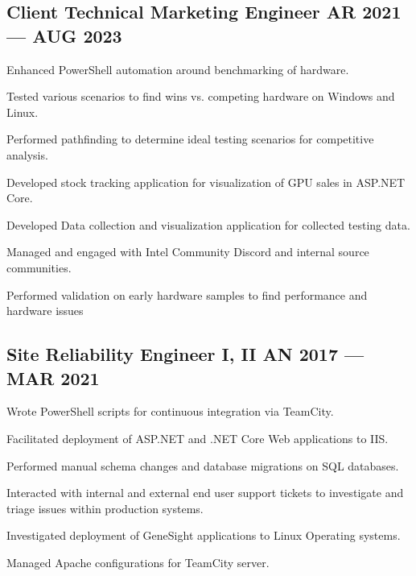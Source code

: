 \subsection{{Client Technical Marketing Engineer \texorpdfstring{\hfill} \texorpdfstring{\null} MAR 2021 --- AUG 2023}}
\begin{zitemize}
\item Enhanced PowerShell automation around benchmarking of hardware.
\item Tested various scenarios to find wins vs. competing hardware on Windows and Linux.
\item Performed pathfinding to determine ideal testing scenarios for competitive analysis.
\item Developed stock tracking application for visualization of GPU sales in ASP.NET Core.
\item Developed Data collection and visualization application for collected testing data.
\item Managed and engaged with Intel Community Discord and internal source communities.
\item Performed validation on early hardware samples to find performance and hardware issues
\end{zitemize}

\subsection{{Site Reliability Engineer I, II \texorpdfstring{\hfill} \texorpdfstring{\null} JAN 2017 --- MAR 2021}}
\begin{zitemize}
\item Wrote PowerShell scripts for continuous integration via TeamCity.
\item Facilitated deployment of ASP.NET and .NET Core Web applications to IIS.
\item Performed manual schema changes and database migrations on SQL databases.
\item Interacted with internal and external end user support tickets to investigate and triage issues within production systems.
\item Investigated deployment of GeneSight applications to Linux Operating systems.
\item Managed Apache configurations for TeamCity server.
\end{zitemize}

